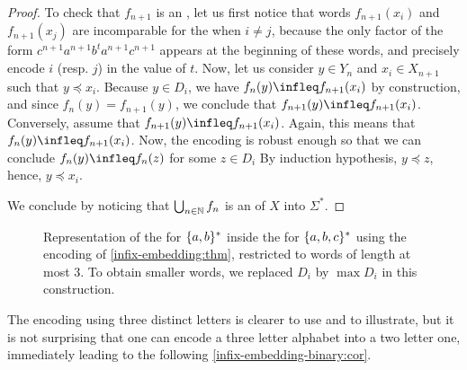 \begin{proof}
    To check that $f_{n+1}$ is an , let us first notice that
    words $f_{n+1}(x_i)$ and $f_{n+1}(x_j)$ are incomparable for the  when $i \neq j$, because the only factor of the form $c^{n+1}
    a^{n+1} b^t a^{n+1} c^{n+1}$ appears at the beginning of these words, and
    precisely encode $i$ (resp. $j$) in the value of $t$. Now, let us consider
    $y \in Y_n$ and $x_i \in X_{n+1}$ such that $y \preceq x_i$. Because $y \in
    D_i$, we have $f_n(y) \infleq f_{n+1}(x_i)$ by construction, and since
    $f_n(y) = f_{n+1}(y)$, we conclude that $f_{n+1}(y) \infleq f_{n+1}(x_i)$.
    Conversely, assume that $f_{n+1}(y) \infleq f_{n+1}(x_i)$. Again, this
    means that $f_n(y) \infleq f_{n+1}(x_i)$. Now, the encoding is robust
    enough so that we can conclude $f_{n}(y) \infleq f_{n}(z)$ for some $z \in
    D_i$ By induction hypothesis, $y \preceq z$, hence, $y \preceq x_i$.

    We conclude by noticing that $\bigcup_{n \in \mathbb{N}} f_n$ is an 
    of $X$ into $\Sigma^*$.
\end{proof}

\begin{figure}
    \centering
    
    \caption{Representation of the  for $\{ a,b \}^*$
        inside the  for $\{ a,b,c \}^*$
        using the encoding of \cref{infix-embedding:thm}, restricted to words
        of length at most $3$. To obtain smaller words,
        we replaced $D_i$ by $\max D_i$ in this construction.
    }
    \label{infix-embedding:fig}
\end{figure}


The encoding using three distinct letters is clearer to use and to
illustrate, but it is not surprising that one can encode a three
letter alphabet into a two letter one, immediately
leading to the following \cref{infix-embedding-binary:cor}.

